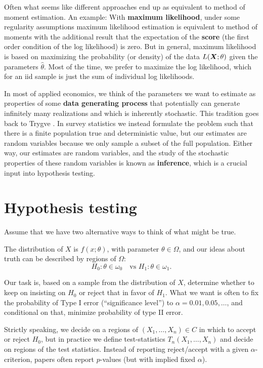 \documentclass[twoside]{article}
\begin{document}
Often what seems like different approaches end up as equivalent to method of moment estimation.
An example: With \textbf{maximum likelihood}, under some regularity assumptions maximum likelihood 
estimation is equivalent to method of moments with the additional result that the expectation 
of the \textbf{score} (the first order condition of the log likelihood) is zero. But in general,
maximum likelihood is based on maximizing the probability (or density) of the data $L(\bm X;\theta)$ 
given the parameters $\widehat{\theta}$. Most of the time, we prefer to maximize the log likelihood,
which for an iid sample is just the sum of individual log likelihoods.

In most of applied economics, we think of the parameters we want to estimate as properties
of some \textbf{data generating process} that potentially can generate infinitely many realizations and
which is inherently stochastic. This tradition goes back to Trygve \citet{Haavelmo44}.
In survey statistics we instead formulate the problem such that there is a finite population true and
deterministic value, but our estimates are random variables because we only sample a subset of the
full population. Either way, our estimates are random variables, and the study of the stochastic
properties of these random variables is known as \textbf{inference}, which is a crucial input
into hypothesis testing. 

\section{Hypothesis testing}
Assume that we have two alternative ways to think of what might
be true.

The distribution of $X$ is $f(x;\theta)$, with parameter
$\theta\in\Omega$, and our ideas about truth can be described by
regions of $\Omega$:
\[ H_0: \theta\in\omega_0 \quad \text{vs $H_1: \theta\in\omega_1$.}
\]

Our task is, based on a sample from the distribution of $X$, determine
whether to keep on insisting on $H_0$ or reject that in favor of
$H_1$. What we want is often to fix the probability of Type I error
(``significance level'') to $\alpha=0.01,0.05,\dots$, and conditional
on that, minimize probability of type II error.

Strictly speaking, we decide on a regions of $(X_1,\dots,X_n)\in C$ in
which to accept or reject $H_0$, but in practice we define
test-statistics $T_n(X_1,\dots,X_n)$ and decide on regions of the test
statistics.
Instead of reporting reject/accept with a given $\alpha$-criterion, papers often report $p$-values (but with
implied fixed $\alpha$). 
\end{document}
